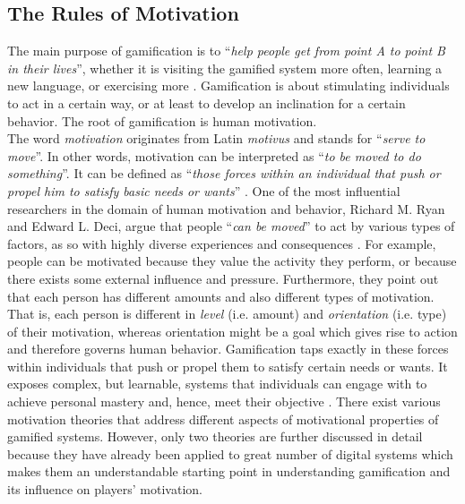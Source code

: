 \subsection{The Rules of Motivation}
The main purpose of gamification is to ``\textit{help people get from point A to point B in their lives}'', whether it is visiting the gamified system more often, learning a new language, or exercising more \cite{gamificationPurpose}. Gamification is about stimulating individuals to act in a certain way, or at least to develop an inclination for a certain behavior. The root of gamification is human motivation.\\The word \textit{motivation} originates from Latin \textit{motivus} and stands for ``\textit{serve to move}''. In other words, motivation can be interpreted as ``\textit{to be moved to do something}''\cite{ryan2000intrinsic}. It can be defined as ``\textit{those forces within an individual that push or propel him to satisfy basic needs or wants}'' \cite{pardee1990motivation}. One of the most influential researchers in the domain of human motivation and behavior, Richard M. Ryan and Edward L. Deci, argue that people ``\textit{can be moved}'' to act by various types of factors, as so with highly diverse experiences and consequences \cite{ryan2000intrinsic}. For example, people can be motivated because they value the activity they perform, or because there exists some external influence and pressure. Furthermore, they point out that each person has different amounts and also different types of motivation. That is, each person is different in \textit{level} (i.e. amount) and \textit{orientation} (i.e. type) of their motivation, whereas orientation might be a goal which gives rise to action and therefore governs human behavior. Gamification taps exactly in these forces within individuals that push or propel them to satisfy certain needs or wants. It exposes complex, but learnable, systems that individuals can engage with to achieve personal mastery and, hence, meet their objective \cite{gamificationPurpose}. There exist various motivation theories that address different aspects of motivational properties of gamified systems. However, only two theories are further discussed in detail because they have already been applied to great number of digital systems which makes them an understandable starting point in understanding gamification and its influence on players' motivation.

